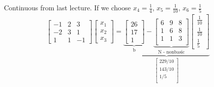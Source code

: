 Continuous from last lecture. If we choose $x_4 = \frac{1}{4}$, $x_5 = \frac{1}{10}$, $x_6 = \frac{1}{5}$
\begin{gather*}
	\begin{bmatrix}
		-1 & 2 & 3\\
		-2 & 3 & 1\\
		1 & 1 & -1
	\end{bmatrix}
	\begin{bmatrix}
		x_1\\
		x_2\\
		x_3
	\end{bmatrix} = 
	\underbrace{\underbrace{\begin{bmatrix}
		26\\
		17\\
		1
	\end{bmatrix}}_{\text{b}} - 
	\underbrace{\begin{bmatrix}
		6 & 9 & 8\\
		1 & 6 & 8\\
		1 & 1 & 3\\
	\end{bmatrix}}_{\text{N - nonbasic}}
	\begin{bmatrix}
		\frac{1}{10}\\
		\frac{1}{10}\\
		\frac{1}{5}
	\end{bmatrix}}_{\begin{bmatrix}
		229/10\\
		143/10\\
		1/5\\
	\end{bmatrix}}
\end{gather*}
